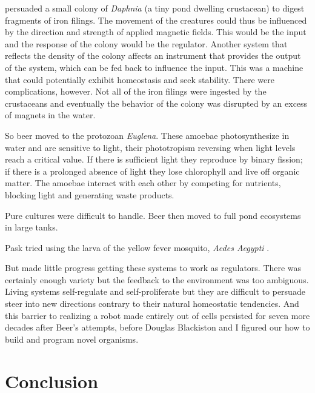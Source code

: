 \citet{beer1962progress}
persuaded a small colony of \textit{Daphnia} (a tiny pond dwelling crustacean) to digest fragments of iron filings.
The movement of the creatures could thus be influenced by 
the direction and strength of applied magnetic fields.
This would be the input and the response of the colony would be the regulator.
Another system that reflects the density of the colony affects an instrument that provides the output of the system, which can be fed back to influence the input.
This was a machine that could potentially exhibit homeostasis and seek stability.
There were complications, however.
Not all of the iron filings were ingested by the crustaceans and eventually the behavior of the colony was disrupted by an excess of magnets in the water.

So beer moved to the protozoan \textit{Euglena}.
These amoebae photosynthesize in water and are sensitive to light, their
phototropism reversing when light levels reach a critical value. 
If there is sufficient light they reproduce by binary fission; if there is a prolonged absence of light they lose chlorophyll and live off organic matter. 
The amoebae interact with each other by competing for nutrients, blocking light and generating waste products.

Pure cultures were difficult to handle.
Beer then moved to full pond ecosystems in large tanks.

Pask tried using the larva of the yellow fever mosquito, \textit{Aedes Aegypti} \cite{beer1962progress}.

But made little progress getting these systems to work as regulators.
There was certainly enough variety but the feedback to the environment was too ambiguous.
Living systems self-regulate and self-proliferate but they are difficult to persuade steer into new directions contrary to their natural homeostatic tendencies.
And this barrier to realizing a robot made entirely out of cells persisted for seven more decades after Beer's attempts, before Douglas Blackiston and I figured our how to build and program novel organisms.




\section{Conclusion}



